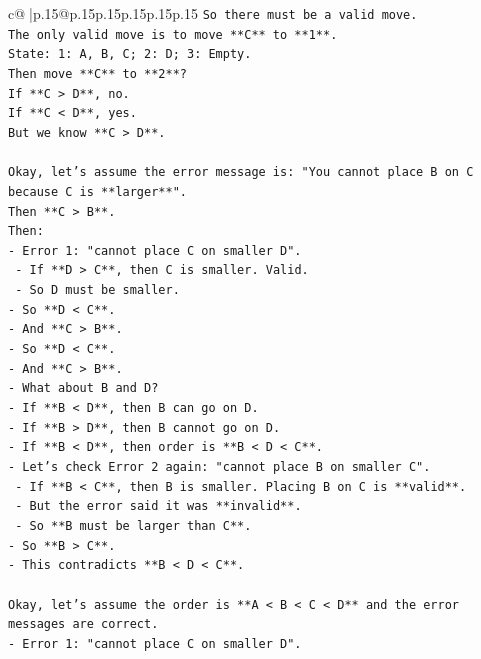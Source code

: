 \documentclass{article}
\begin{document}
{\begin{supertabular}{c@{$\;$}|p{.15\linewidth}@{}p{.15\linewidth}p{.15\linewidth}p{.15\linewidth}p{.15\linewidth}p{.15\linewidth}}
{{{\texttt{So there must be a valid move.} \\
\texttt{The only valid move is to move **C** to **1**.} \\
\texttt{State: 1: A, B, C; 2: D; 3: Empty.} \\
\texttt{Then move **C** to **2**?} \\
\texttt{If **C > D**, no.} \\
\texttt{If **C < D**, yes.} \\
\texttt{But we know **C > D**.} \\
\\ 
\texttt{Okay, let's assume the error message is: "You cannot place B on C because C is **larger**".} \\
\texttt{Then **C > B**.} \\
\texttt{Then:} \\
\texttt{{-} Error 1: "cannot place C on smaller D".} \\
\texttt{    {-} If **D > C**, then C is smaller. Valid.} \\
\texttt{    {-} So D must be smaller.} \\
\texttt{{-} So **D < C**.} \\
\texttt{{-} And **C > B**.} \\
\texttt{{-} So **D < C**.} \\
\texttt{{-} And **C > B**.} \\
\texttt{{-} What about B and D?} \\
\texttt{{-} If **B < D**, then B can go on D.} \\
\texttt{{-} If **B > D**, then B cannot go on D.} \\
\texttt{{-} If **B < D**, then order is **B < D < C**.} \\
\texttt{{-} Let's check Error 2 again: "cannot place B on smaller C".} \\
\texttt{    {-} If **B < C**, then B is smaller. Placing B on C is **valid**.} \\
\texttt{    {-} But the error said it was **invalid**.} \\
\texttt{    {-} So **B must be larger than C**.} \\
\texttt{{-} So **B > C**.} \\
\texttt{{-} This contradicts **B < D < C**.} \\
\\ 
\texttt{Okay, let's assume the order is **A < B < C < D** and the error messages are correct.} \\
\texttt{{-} Error 1: "cannot place C on smaller D".} \\
}}}
\end{supertabular}}
\end{document}
